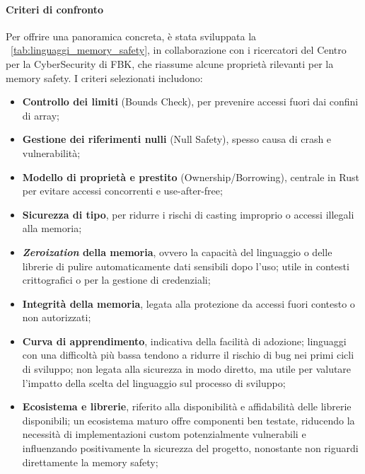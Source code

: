 \paragraph{Criteri di confronto}
Per offrire una panoramica concreta, è stata sviluppata la ~\autoref{tab:linguaggi_memory_safety},
in collaborazione con i ricercatori del Centro per la CyberSecurity di FBK\footnotemark,
che riassume alcune proprietà rilevanti per la memory safety. I criteri
selezionati includono:
\begin{itemize}
  \item \textbf{Controllo dei limiti} (Bounds Check), per prevenire accessi fuori
    dai confini di array;

  \item \textbf{Gestione dei riferimenti nulli} (Null Safety), spesso causa di crash
    e vulnerabilità;

  \item \textbf{Modello di proprietà e prestito} (Ownership/Borrowing), centrale
    in Rust per evitare accessi concorrenti e use-after-free;

  \item \textbf{Sicurezza di tipo}, per ridurre i rischi di casting improprio o accessi
    illegali alla memoria;

  \item \textbf{\textit{Zeroization} della memoria}, ovvero la capacità del linguaggio
    o delle librerie di pulire automaticamente dati sensibili dopo l'uso; utile
    in contesti crittografici o per la gestione di credenziali;

  \item \textbf{Integrità della memoria}, legata alla protezione da accessi fuori
    contesto o non autorizzati;

  \item \textbf{Curva di apprendimento}, indicativa della facilità di adozione;
    linguaggi con una difficoltà più bassa tendono a ridurre il rischio di bug
    nei primi cicli di sviluppo; non legata alla sicurezza in modo diretto, ma
    utile per valutare l'impatto della scelta del linguaggio sul processo di
    sviluppo;

  \item \textbf{Ecosistema e librerie}, riferito alla disponibilità e affidabilità
    delle librerie disponibili; un ecosistema maturo offre componenti ben
    testate, riducendo la necessità di implementazioni custom potenzialmente vulnerabili
    e influenzando positivamente la sicurezza del progetto, nonostante non
    riguardi direttamente la memory safety;
\end{itemize}

